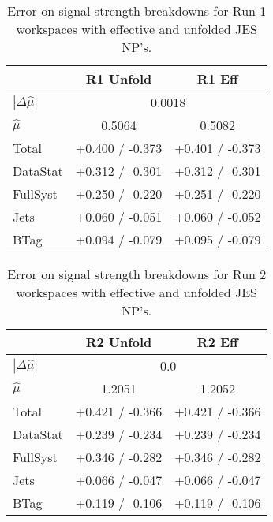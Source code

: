 \begin{table}[!htbp]\captionsetup{justification=centering}
\begin{center}\begin{tabular}{lcc}
\hline\hline
 & R1 Unfold & R1 Eff \\
\hline
$\left|\Delta\hat{\mu}\right|$ &  \multicolumn{2}{c}{0.0018} \\
$\hat{\mu}$ & 0.5064 & 0.5082 \\
\hline
Total &  +0.400 / -0.373  &  +0.401 / -0.373  \\
DataStat &  +0.312 / -0.301  &  +0.312 / -0.301\\
FullSyst &  +0.250 / -0.220  &  +0.251 / -0.220\\
\hline
Jets &  +0.060 / -0.051  &  +0.060 / -0.052  \\
BTag &  +0.094 / -0.079  &  +0.095 / -0.079  \\
\hline
\hline
\end{tabular}
\caption{Error on signal strength breakdowns for  Run 1 workspaces with effective and unfolded JES NP's.}
\label{tab:unfold_jes_breakdowns1}
\end{center}
\end{table}


\begin{table}[!htbp]\captionsetup{justification=centering}
\begin{center}\begin{tabular}{lcc}
\hline\hline
 & R2 Unfold & R2 Eff\\
\hline
$\left|\Delta\hat{\mu}\right|$ &  \multicolumn{2}{c}{0.0}\\
$\hat{\mu}$ & 1.2051 & 1.2052\\
\hline
Total & +0.421 / -0.366  &  +0.421 / -0.366\\
DataStat &  +0.239 / -0.234  &  +0.239 / -0.234\\
FullSyst &  +0.346 / -0.282  &  +0.346 / -0.282\\
\hline
Jets &  +0.066 / -0.047  &  +0.066 / -0.047\\
BTag &  +0.119 / -0.106  &  +0.119 / -0.106\\
\hline
\hline
\end{tabular}
\caption{Error on signal strength breakdowns for Run 2 workspaces with effective and unfolded JES NP's.}
\label{tab:unfold_jes_breakdowns2}
\end{center}
\end{table}


